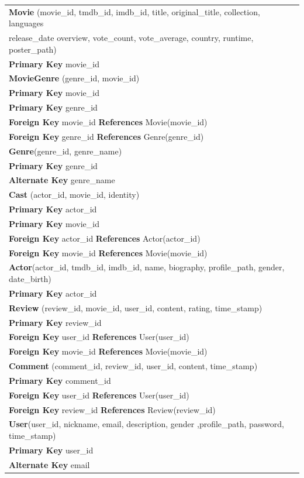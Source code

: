 \documentclass[12pt]{article}
\begin{document}
\begin{table}[H]
\centering
\renewcommand\arraystretch{1.08}
	\begin{tabular}{|l|}
		\hline
		\textbf{Movie} (movie\_id, tmdb\_id, imdb\_id, title, original\_title, collection, languages\\release\_date overview, vote\_count, vote\_average, country, runtime, poster\_path)\\
		\textbf{Primary Key} movie\_id\\
        \hline
        \textbf{MovieGenre} (genre\_id, movie\_id)\\
        \textbf{Primary Key} movie\_id\\
        \textbf{Primary Key} genre\_id\\
        \textbf{Foreign Key} movie\_id \textbf{References} Movie(movie\_id)\\
        \textbf{Foreign Key} genre\_id \textbf{References} Genre(genre\_id)\\
        \hline
        \textbf {Genre}(genre\_id, genre\_name)\\
        \textbf{Primary Key} genre\_id\\
        \textbf{Alternate Key} genre\_name\\
        \hline
        \textbf{Cast} (actor\_id, movie\_id, identity)\\
        \textbf{Primary Key} actor\_id\\
        \textbf{Primary Key} movie\_id\\
        \textbf{Foreign Key} actor\_id \textbf{References} Actor(actor\_id)\\
        \textbf{Foreign Key} movie\_id \textbf{References} Movie(movie\_id)\\
        \hline
        \textbf {Actor}(actor\_id, tmdb\_id, imdb\_id, name, biography, profile\_path, gender, date\_birth)\\
        \textbf{Primary Key} actor\_id\\
        \hline
        \textbf{Review} (review\_id, movie\_id, user\_id, content, rating, time\_stamp)\\
        \textbf{Primary Key} review\_id\\
        \textbf{Foreign Key} user\_id \textbf{References} User(user\_id)\\
        \textbf{Foreign Key} movie\_id \textbf{References} Movie(movie\_id)\\ \hline
        \textbf{Comment} (comment\_id, review\_id, user\_id, content, time\_stamp)\\
        \textbf{Primary Key} comment\_id\\
        \textbf{Foreign Key} user\_id \textbf{References} User(user\_id)\\
        \textbf{Foreign Key} review\_id \textbf{References} Review(review\_id)\\
        \hline
        \textbf {User}(user\_id, nickname, email, description, gender ,profile\_path, password, time\_stamp)\\
        \textbf{Primary Key} user\_id\\
        \textbf{Alternate Key} email\\
        \hline
	\end{tabular}
\end{table}
\end{document}
